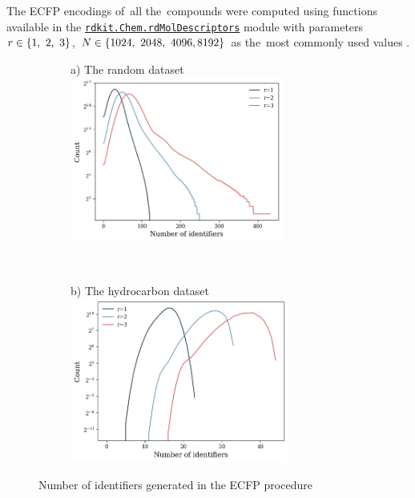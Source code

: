 The ECFP encodings of~all the~compounds were computed using functions available in the \href{https://www.rdkit.org/docs/source/rdkit.Chem.rdMolDescriptors.html}{\texttt{rdkit.Chem.rdMolDescriptors}} module with parameters \( r \in \set{1, \ 2, \ 3} \), \( N \in \set{1024, \ 2048, \ 4096, \linebreak 8192} \) as the~most commonly used values \cite{chemaxon2025docs, le2020decipher}.
\begin{figure}[H]
    \centering
    \begin{subfigure}[!t]{0.5\textwidth}
        \centering
        a) The random dataset
        \includegraphics[height=5.4cm]{figures/num_bits}
    \end{subfigure}%
    ~
    \begin{subfigure}[!t]{0.5\textwidth}
        \centering
        b) The hydrocarbon dataset
        \includegraphics[height=5.4cm]{figures/num_bits_c22}
    \end{subfigure}
    \caption{Number of identifiers generated in the ECFP procedure}
    \label{fig:num_bits}
\end{figure}

